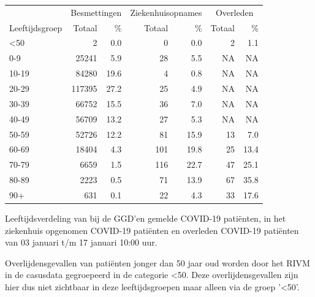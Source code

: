\documentclass[
  english,
  man,floatsintext]{apa6}
\begin{document}
\begin{table}
\centering\begingroup\fontsize{11}{13}\selectfont

\begin{threeparttable}
\begin{tabular}{lrrrrrr}
\toprule
\multicolumn{1}{c}{ } & \multicolumn{2}{c}{Besmettingen} & \multicolumn{2}{c}{Ziekenhuisopnames} & \multicolumn{2}{c}{Overleden} \\
\cmidrule(l{3pt}r{3pt}){2-3} \cmidrule(l{3pt}r{3pt}){4-5} \cmidrule(l{3pt}r{3pt}){6-7}
Leeftijdsgroep & Totaal & \% & Totaal & \% & Totaal & \%\\
\midrule
<50 & 2 & 0.0 & 0 & 0.0 & 2 & 1.1\\
0-9 & 25241 & 5.9 & 28 & 5.5 & NA & NA\\
10-19 & 84280 & 19.6 & 4 & 0.8 & NA & NA\\
20-29 & 117395 & 27.2 & 25 & 4.9 & NA & NA\\
30-39 & 66752 & 15.5 & 36 & 7.0 & NA & NA\\
40-49 & 56709 & 13.2 & 27 & 5.3 & NA & NA\\
50-59 & 52726 & 12.2 & 81 & 15.9 & 13 & 7.0\\
60-69 & 18404 & 4.3 & 101 & 19.8 & 25 & 13.4\\
70-79 & 6659 & 1.5 & 116 & 22.7 & 47 & 25.1\\
80-89 & 2223 & 0.5 & 71 & 13.9 & 67 & 35.8\\
90+ & 631 & 0.1 & 22 & 4.3 & 33 & 17.6\\
\bottomrule
\end{tabular}
\begin{tablenotes}
\item[1] Leeftijdsverdeling van bij de GGD’en gemelde COVID-19 patiënten, in het ziekenhuis opgenomen COVID-19 patiënten en overleden COVID-19 patiënten van 03 januari t/m 17 januari 10:00 uur.
\item[2] Overlijdensgevallen van patiënten jonger dan 50 jaar oud worden door het RIVM in de casusdata gegroepeerd in de categorie <50. Deze overlijdensgevallen zijn hier dus niet zichtbaar in deze leeftijdsgroepen maar alleen via de groep '<50'.
\end{tablenotes}
\end{threeparttable}
\endgroup{}
\end{table}

\newpage
\end{document}
